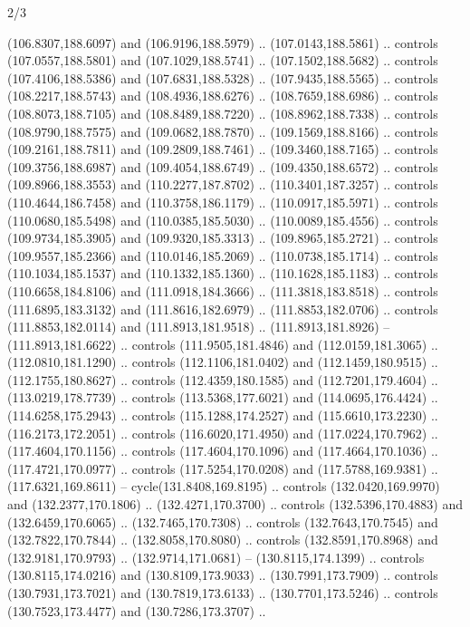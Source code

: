\begin{flagdescription}{2/3}
\begin{scope}[shift={(0.5\flaglength,0.5)},scale=\flagwidth/320]
\begin{scope}[y=0.8pt, x=0.8pt, yscale=-1,shift={(-118.3,-146)}]
  (106.8307,188.6097) and (106.9196,188.5979) .. (107.0143,188.5861) .. controls
  (107.0557,188.5801) and (107.1029,188.5741) .. (107.1502,188.5682) .. controls
  (107.4106,188.5386) and (107.6831,188.5328) .. (107.9435,188.5565) .. controls
  (108.2217,188.5743) and (108.4936,188.6276) .. (108.7659,188.6986) .. controls
  (108.8073,188.7105) and (108.8489,188.7220) .. (108.8962,188.7338) .. controls
  (108.9790,188.7575) and (109.0682,188.7870) .. (109.1569,188.8166) .. controls
  (109.2161,188.7811) and (109.2809,188.7461) .. (109.3460,188.7165) .. controls
  (109.3756,188.6987) and (109.4054,188.6749) .. (109.4350,188.6572) .. controls
  (109.8966,188.3553) and (110.2277,187.8702) .. (110.3401,187.3257) .. controls
  (110.4644,186.7458) and (110.3758,186.1179) .. (110.0917,185.5971) .. controls
  (110.0680,185.5498) and (110.0385,185.5030) .. (110.0089,185.4556) .. controls
  (109.9734,185.3905) and (109.9320,185.3313) .. (109.8965,185.2721) .. controls
  (109.9557,185.2366) and (110.0146,185.2069) .. (110.0738,185.1714) .. controls
  (110.1034,185.1537) and (110.1332,185.1360) .. (110.1628,185.1183) .. controls
  (110.6658,184.8106) and (111.0918,184.3666) .. (111.3818,183.8518) .. controls
  (111.6895,183.3132) and (111.8616,182.6979) .. (111.8853,182.0706) .. controls
  (111.8853,182.0114) and (111.8913,181.9518) .. (111.8913,181.8926) --
  (111.8913,181.6622) .. controls (111.9505,181.4846) and (112.0159,181.3065) ..
  (112.0810,181.1290) .. controls (112.1106,181.0402) and (112.1459,180.9515) ..
  (112.1755,180.8627) .. controls (112.4359,180.1585) and (112.7201,179.4604) ..
  (113.0219,178.7739) .. controls (113.5368,177.6021) and (114.0695,176.4424) ..
  (114.6258,175.2943) .. controls (115.1288,174.2527) and (115.6610,173.2230) ..
  (116.2173,172.2051) .. controls (116.6020,171.4950) and (117.0224,170.7962) ..
  (117.4604,170.1156) .. controls (117.4604,170.1096) and (117.4664,170.1036) ..
  (117.4721,170.0977) .. controls (117.5254,170.0208) and (117.5788,169.9381) ..
  (117.6321,169.8611) -- cycle(131.8408,169.8195) .. controls
  (132.0420,169.9970) and (132.2377,170.1806) .. (132.4271,170.3700) .. controls
  (132.5396,170.4883) and (132.6459,170.6065) .. (132.7465,170.7308) .. controls
  (132.7643,170.7545) and (132.7822,170.7844) .. (132.8058,170.8080) .. controls
  (132.8591,170.8968) and (132.9181,170.9793) .. (132.9714,171.0681) --
  (130.8115,174.1399) .. controls (130.8115,174.0216) and (130.8109,173.9033) ..
  (130.7991,173.7909) .. controls (130.7931,173.7021) and (130.7819,173.6133) ..
  (130.7701,173.5246) .. controls (130.7523,173.4477) and (130.7286,173.3707) ..

\end{scope}
\end{scope}
\end{flagdescription}

